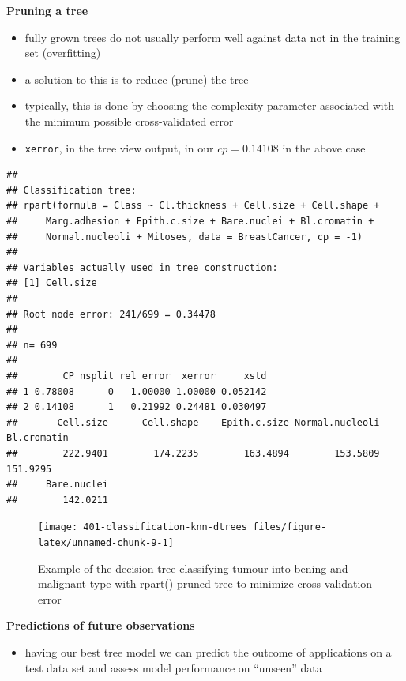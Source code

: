 \documentclass[
]{book}
\providecommand{\tightlist}{%
  \setlength{\itemsep}{0pt}\setlength{\parskip}{0pt}}
\theoremstyle{definition}
\theoremstyle{definition}
\theoremstyle{definition}
\theoremstyle{remark}
\begin{document}
\textbf{Pruning a tree}

\begin{itemize}
\tightlist
\item
  fully grown trees do not usually perform well against data not in the training set (overfitting)
\item
  a solution to this is to reduce (prune) the tree
\item
  typically, this is done by choosing the complexity parameter associated with the minimum possible cross-validated error
\item
  \texttt{xerror}, in the tree view output, in our \(cp = 0.14108\) in the above case
\end{itemize}

\begin{verbatim}
## 
## Classification tree:
## rpart(formula = Class ~ Cl.thickness + Cell.size + Cell.shape + 
##     Marg.adhesion + Epith.c.size + Bare.nuclei + Bl.cromatin + 
##     Normal.nucleoli + Mitoses, data = BreastCancer, cp = -1)
## 
## Variables actually used in tree construction:
## [1] Cell.size
## 
## Root node error: 241/699 = 0.34478
## 
## n= 699 
## 
##        CP nsplit rel error  xerror     xstd
## 1 0.78008      0   1.00000 1.00000 0.052142
## 2 0.14108      1   0.21992 0.24481 0.030497
##       Cell.size      Cell.shape    Epith.c.size Normal.nucleoli     Bl.cromatin 
##        222.9401        174.2235        163.4894        153.5809        151.9295 
##     Bare.nuclei 
##        142.0211
\end{verbatim}

\begin{figure}

{\centering \texttt{[image: 401-classification-knn-dtrees\_files/figure-latex/unnamed-chunk-9-1]} 

}

\caption{Example of the decision tree classifying tumour into bening and malignant type with rpart() pruned tree to minimize cross-validation error}\label{fig:unnamed-chunk-9}
\end{figure}

\textbf{Predictions of future observations}

\begin{itemize}
\tightlist
\item
  having our best tree model we can predict the outcome of applications on a test data set and assess model performance on ``unseen'' data
\end{itemize}
\end{document}
